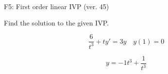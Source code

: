 \begin{exercise}
  \begin{exerciseTitle}F5: First order linear IVP (ver. 45)\end{exerciseTitle}
  \begin{exerciseStatement}
    
Find the solution to the given IVP.

    
\[\frac{6}{t^{3}} +ty'= 3 y \hspace{1em} y( 1 ) = 0\]

  \end{exerciseStatement}
  \begin{exerciseAnswer}
    
\[y= -1 t^ 3 + \frac{1}{t^{3}}\]

  \end{exerciseAnswer}
\end{exercise}